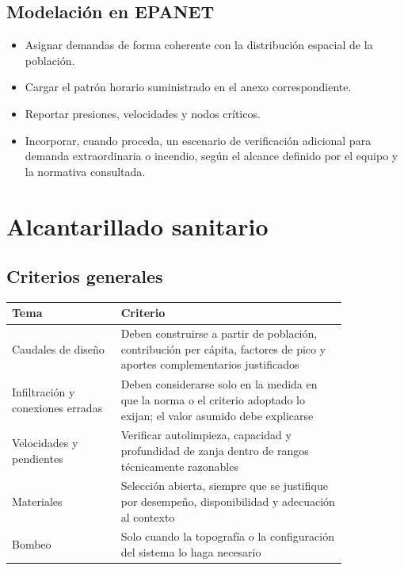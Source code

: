 \documentclass[11pt]{article}
\begin{document}
\subsection{Modelaci\'on en EPANET}
\begin{itemize}
\item Asignar demandas de forma coherente con la distribuci\'on espacial de la poblaci\'on.
\item Cargar el patr\'on horario suministrado en el anexo correspondiente.
\item Reportar presiones, velocidades y nodos cr\'iticos.
\item Incorporar, cuando proceda, un escenario de verificaci\'on adicional para demanda extraordinaria o incendio, seg\'un el alcance definido por el equipo y la normativa consultada.
\end{itemize}

\section{Alcantarillado sanitario}
\subsection{Criterios generales}
\begin{center}
\begin{tabular}{p{0.27\linewidth} p{0.57\linewidth}}
\toprule
\textbf{Tema} & \textbf{Criterio} \\
\midrule
Caudales de dise\~no & Deben construirse a partir de poblaci\'on, contribuci\'on per c\'apita, factores de pico y aportes complementarios justificados \\
Infiltraci\'on y conexiones erradas & Deben considerarse solo en la medida en que la norma o el criterio adoptado lo exijan; el valor asumido debe explicarse \\
Velocidades y pendientes & Verificar autolimpieza, capacidad y profundidad de zanja dentro de rangos t\'ecnicamente razonables \\
Materiales & Selecci\'on abierta, siempre que se justifique por desempe\~no, disponibilidad y adecuaci\'on al contexto \\
Bombeo & Solo cuando la topograf\'ia o la configuraci\'on del sistema lo haga necesario \\
\bottomrule
\end{tabular}
\end{center}
\end{document}
